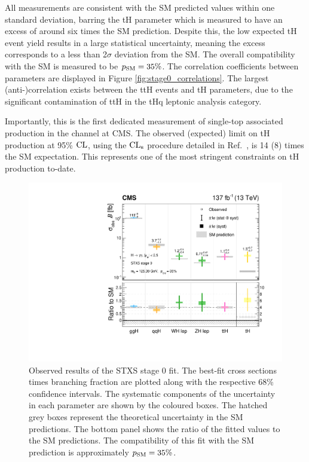 All measurements are consistent with the SM predicted values within one standard deviation, barring the tH parameter which is measured to have an excess of around six times the SM prediction. Despite this, the low expected tH event yield results in a large statistical uncertainty, meaning the excess corresponds to a less than 2$\sigma$ deviation from the SM. The overall compatibility with the SM is measured to be $p_{\rm{SM}}=35\%$. The correlation coefficients between parameters are displayed in Figure \ref{fig:stage0_correlations}. The largest (anti-)correlation exists between the ttH events and tH parameters, due to the significant contamination of ttH in the tHq leptonic analysis category.

Importantly, this is the first dedicated measurement of single-top associated production in the \Hgg channel at CMS. The observed (expected) limit on tH production at 95\% $\rm{CL}$, using the $\rm{CL}_s$ procedure detailed in Ref.~\cite{CMS-NOTE-2011-005}, is 14 (8) times the SM expectation. This represents one of the most stringent constraints on tH production to-date.

\begin{figure}[htb!]
  \centering
  \includegraphics[width=.6\textwidth]{Figures/hgg_results/stage0_summary.pdf}
  \caption[Results of the STXS stage 0 fit]
  {
    Observed results of the STXS stage 0 fit. The best-fit cross sections times branching fraction are plotted along with the respective 68\% confidence intervals. The systematic components of the uncertainty in each parameter are shown by the coloured boxes. The hatched grey boxes represent the theoretical uncertainty in the SM predictions. The bottom panel shows the ratio of the fitted values to the SM predictions. The compatibility of this fit with the SM prediction is approximately $p_{\rm{SM}}=35\%$. 
  }
  \label{fig:stage0_results}
\end{figure}

